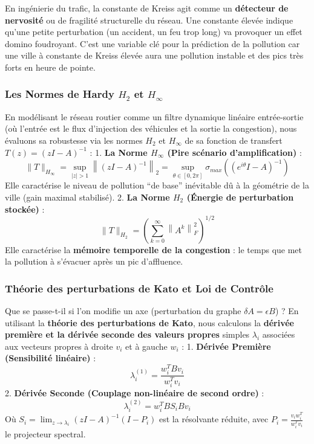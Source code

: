 \documentclass[11pt, a4paper]{article}
\begin{document}
En ingénierie du trafic, la constante de Kreiss agit comme un
\textbf{détecteur de nervosité} ou de fragilité structurelle du réseau.
Une constante élevée indique qu'une petite perturbation (un accident, un
feu trop long) va provoquer un effet domino foudroyant. C'est une
variable clé pour la prédiction de la pollution car une ville à
constante de Kreiss élevée aura une pollution instable et des pics très
forts en heure de pointe.

\subsubsection{\texorpdfstring{Les Normes de Hardy \(H_2\) et
\(H_\infty\)}{Les Normes de Hardy H\_2 et H\_\textbackslash infty}}\label{les-normes-de-hardy-h_2-et-h_infty}

En modélisant le réseau routier comme un filtre dynamique linéaire
entrée-sortie (où l'entrée est le flux d'injection des véhicules et la
sortie la congestion), nous évaluons sa robustesse via les normes
\(H_2\) et \(H_\infty\) de sa fonction de transfert
\(T(z) = (zI - A)^{-1}\) : 1. \textbf{La Norme \(H_\infty\) (Pire
scénario d'amplification)} :
\[\|T\|_{H_\infty} = \sup_{|z| > 1} \left\| (zI - A)^{-1} \right\|_2 = \sup_{\theta \in [0, 2\pi]} \sigma_{max}\left( (e^{i\theta}I - A)^{-1} \right)\]
Elle caractérise le niveau de pollution ``de base'' inévitable dû à la
géométrie de la ville (gain maximal stabilisé). 2. \textbf{La Norme
\(H_2\) (Énergie de perturbation stockée)} :
\[\|T\|_{H_2} = \left( \sum_{k=0}^{\infty} \left\| A^k \right\|_F^2 \right)^{1/2}\]
Elle caractérise la \textbf{mémoire temporelle de la congestion} : le
temps que met la pollution à s'évacuer après un pic d'affluence.

\subsubsection{Théorie des perturbations de Kato et Loi de
Contrôle}\label{thuxe9orie-des-perturbations-de-kato-et-loi-de-contruxf4le}

Que se passe-t-il si l'on modifie un axe (perturbation du graphe
\(\delta A = \epsilon B\)) ? En utilisant la \textbf{théorie des
perturbations de Kato}, nous calculons la \textbf{dérivée première et la
dérivée seconde des valeurs propres} simples \(\lambda_i\) associées aux
vecteurs propres à droite \(v_i\) et à gauche \(w_i\) : 1.
\textbf{Dérivée Première (Sensibilité linéaire)} :
\[\lambda_i^{(1)} = \frac{w_i^T B v_i}{w_i^T v_i}\] 2. \textbf{Dérivée
Seconde (Couplage non-linéaire de second ordre)} :
\[\lambda_i^{(2)} = w_i^T B S_i B v_i\] Où
\(S_i = \lim_{z \to \lambda_i} (zI - A)^{-1}(I - P_i)\) est la
résolvante réduite, avec \(P_i = \frac{v_i w_i^T}{w_i^T v_i}\) le
projecteur spectral.
\end{document}
